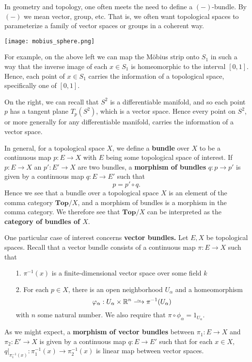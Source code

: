         \begin{example}
            In geometry and topology, one often meets the need to define a $(-)$-bundle. By $(-)$
            we mean vector, group, etc. That is, we often want topological spaces to parameterize 
            a family of vector spaces or groups in a coherent way. 
            \begin{center}
                \texttt{[image: mobius\_sphere.png]}
            \end{center}
 
            For example, on the above left we can map the Möbius strip onto $S_1$ in such a way that the 
            inverse image of each $x \in S_1$ is homeomorphic to the interval $[0, 1]$. Hence, 
            each point of $x \in S_1$ carries the information of a topological space, specifically one of $[0, 1]$.
    
            On the right, we can recall that $S^2$ is a differentiable manifold, and so each point $p$
            has a tangent plane $T_p(S^2)$, which is a vector space. Hence every point on $S^2$, or more generally 
            for any differentiable manifold, carries the information of a vector space. 

            In general, for a topological space $X$, 
            we define a \textbf{bundle} over $X$ to be a continuous map $p: E \to X$ with $E$ being some topological 
            space of interest. If $p: E \to X$ an $p': E' \to X$ are two bundles, a 
            \textbf{morphism of bundles} $q :p  \to p'$ is given by a continuous map $q: E \to E'$ such 
            that 
            \[
                p = p' \circ q.
            \]
            Hence we see that a bundle over a topological space $X$ is an element of the 
            comma category $\textbf{Top}/X$, and a morphism of bundles is a morphism in the comma category. 
            We therefore see that $\textbf{Top}/X$ can be interpreted as the \textbf{category of 
            bundles of $X$}.

            One particular case of interest concerns \textbf{vector bundles.}
            Let $E, X$ be topological spaces. Recall that a vector bundle 
            consists of a continuous map $\pi: E \to X$ such that
            \begin{itemize}
                \item[1.] $\pi^{-1}(x)$ is a finite-dimensional 
                vector space over some field $k$
                \item[2.] For each $p \in X$, there is an open neighborhood $U_{\alpha}$ 
                and a homeomorphism 
                \[
                    \phi_{\alpha}: U_{\alpha} \times \rr^{n} \isomarrow \pi^{-1}(U_{\alpha})
                \] 
                with $n$ some natural number. We also require that $\pi \circ \phi_{\alpha} = 1_{U_\alpha}$.
            \end{itemize}
            As we might expect, a \textbf{morphism of vector bundles} between $\pi_1: E \to X$ and $\pi_2: E' \to X$
            is given by a continuous map $q: E \to E'$ such that for each $x \in X$, 
            $q\big|_{\pi_1^{-1}(x)}: \pi_1^{-1}(x) \to \pi_2^{-1}(x)$ is linear map between vector spaces. 


\end{example}
